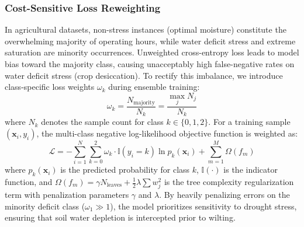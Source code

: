 \subsubsection{Cost-Sensitive Loss Reweighting}
In agricultural datasets, non-stress instances (optimal moisture) constitute the overwhelming majority of operating hours, while water deficit stress and extreme saturation are minority occurrences. Unweighted cross-entropy loss leads to model bias toward the majority class, causing unacceptably high false-negative rates on water deficit stress (crop desiccation). To rectify this imbalance, we introduce class-specific loss weights $\omega_k$ during ensemble training:
\begin{equation}
\omega_k = \frac{N_{\text{majority}}}{N_k} = \frac{\max_{j} N_j}{N_k}
\label{eq:cost_weight}
\end{equation}
where $N_k$ denotes the sample count for class $k \in \{0, 1, 2\}$. For a training sample $(\mathbf{x}_i, y_i)$, the multi-class negative log-likelihood objective function is weighted as:
\begin{equation}
\mathcal{L} = -\sum_{i=1}^{N} \sum_{k=0}^{2} \omega_k \cdot \mathbb{I}(y_i = k) \ln p_k(\mathbf{x}_i) + \sum_{m=1}^{M} \Omega(f_m)
\label{eq:weighted_loss}
\end{equation}
where $p_k(\mathbf{x}_i)$ is the predicted probability for class $k$, $\mathbb{I}(\cdot)$ is the indicator function, and $\Omega(f_m) = \gamma N_{\text{leaves}} + \frac{1}{2} \lambda \sum w_j^2$ is the tree complexity regularization term with penalization parameters $\gamma$ and $\lambda$. By heavily penalizing errors on the minority deficit class ($\omega_1 \gg 1$), the model prioritizes sensitivity to drought stress, ensuring that soil water depletion is intercepted prior to wilting.
